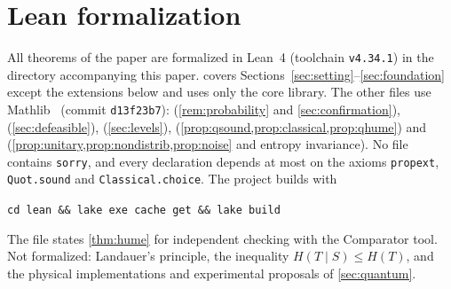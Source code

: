 \section{Lean formalization}\label{app:formalization}

All theorems of the paper are formalized in Lean~4 (toolchain \texttt{v4.34.1}) in the
directory  accompanying this paper.
 covers Sections~\ref{sec:setting}--\ref{sec:foundation} except the extensions
below and uses only the core library. The other files use Mathlib~\cite{mathlib} (commit
\texttt{d13f23b7}):  (\cref{rem:probability} and
\cref{sec:confirmation}),  (\cref{sec:defeasible}), 
(\cref{sec:levels}), 
(\cref{prop:qsound,prop:classical,prop:qhume}) and 
(\cref{prop:unitary,prop:nondistrib,prop:noise} and entropy invariance). No file contains
\texttt{sorry}, and every declaration depends at most on the axioms \texttt{propext},
\texttt{Quot.sound} and \texttt{Classical.choice}. The project builds with
\begin{center}\texttt{cd lean \&\& lake exe cache get \&\& lake build}\end{center}
The file  states
\cref{thm:hume} for independent checking with the Comparator tool. Not formalized: Landauer's
principle, the inequality $H(T\mid S)\le H(T)$, and the physical implementations and experimental
proposals of \cref{sec:quantum}.

